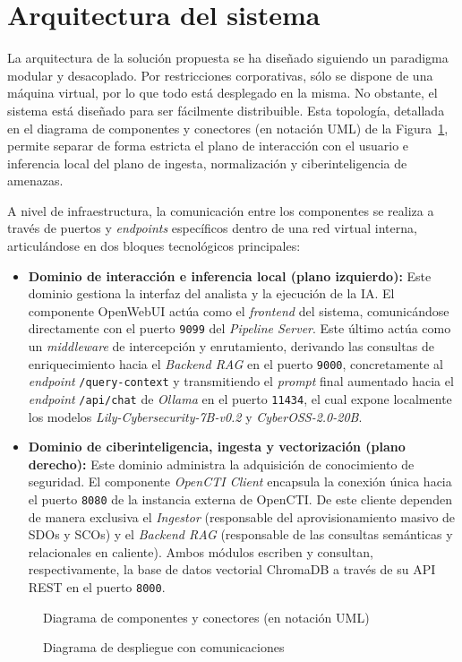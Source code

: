 \documentclass[12pt]{report}
\begin{document}
\section{Arquitectura del sistema}
La arquitectura de la solución propuesta se ha diseñado siguiendo un paradigma modular y desacoplado. Por restricciones corporativas, sólo se dispone de una máquina virtual, por lo que todo está desplegado en la misma. No obstante, el sistema está diseñado para ser fácilmente distribuible. Esta topología, detallada en el diagrama de componentes y conectores (en notación UML) de la Figura~\ref{fig:ArquitecturaCyC}, permite separar de forma estricta el plano de interacción con el usuario e inferencia local del plano de ingesta, normalización y ciberinteligencia de amenazas.

A nivel de infraestructura, la comunicación entre los componentes se realiza a través de puertos y \textit{endpoints} específicos dentro de una red virtual interna, articulándose en dos bloques tecnológicos principales:

\begin{itemize}
	\item \textbf{Dominio de interacción e inferencia local (plano izquierdo):} 
	Este dominio gestiona la interfaz del analista y la ejecución de la IA. El componente OpenWebUI actúa como el \textit{frontend} del sistema, comunicándose directamente con el puerto \texttt{9099} del \textit{Pipeline Server}. Este último actúa como un \textit{middleware} de intercepción y enrutamiento, derivando las consultas de enriquecimiento hacia el \textit{Backend RAG} en el puerto \texttt{9000}, concretamente al \textit{endpoint} \texttt{/query-context} y transmitiendo el \textit{prompt} final aumentado hacia el \textit{endpoint} \texttt{/api/chat} de \textit{Ollama} en el puerto \texttt{11434}, el cual expone localmente los modelos \textit{Lily-Cybersecurity-7B-v0.2} y \textit{CyberOSS-2.0-20B}.
	\item \textbf{Dominio de ciberinteligencia, ingesta y vectorización (plano derecho):} 
	Este dominio administra la adquisición de conocimiento de seguridad. El componente \textit{OpenCTI Client} encapsula la conexión única hacia el puerto \texttt{8080} de la instancia externa de OpenCTI. De este cliente dependen de manera exclusiva el \textit{Ingestor} (responsable del aprovisionamiento masivo de SDOs y SCOs) y el \textit{Backend RAG} (responsable de las consultas semánticas y relacionales en caliente). Ambos módulos escriben y consultan, respectivamente, la base de datos vectorial ChromaDB a través de su API REST en el puerto \texttt{8000}.
\end{itemize}
\begin{figure}[]
	\centering
	
	\caption{Diagrama de componentes y conectores (en notación UML)}
	\label{fig:ArquitecturaCyC}
\end{figure}
\begin{figure}
	\centering
	
	\caption{Diagrama de despliegue con comunicaciones}
	\label{fig:despliegue}
\end{figure}
\end{document}
